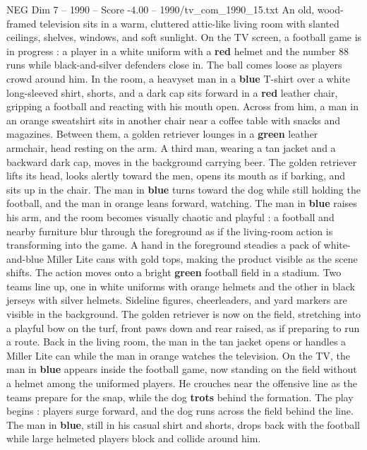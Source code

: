 \begin{textsample}{NEG Dim 7 – 1990 – Score -4.00 – 1990/tv\_com\_1990\_15.txt}  \label{ex:f7_neg_034}
An old, wood-framed television sits in a warm, cluttered attic-like living room with slanted ceilings, shelves, windows, and soft sunlight.
On the TV screen, a football game is in progress : a player in a white uniform with a \textbf{red} helmet and the number 88 runs while black-and-silver defenders close in.
The ball comes loose as players crowd around him.
In the room, a heavyset man in a \textbf{blue} T-shirt over a white long-sleeved shirt, shorts, and a dark cap sits forward in a \textbf{red} leather chair, gripping a football and reacting with his mouth open.
Across from him, a man in an orange sweatshirt sits in another chair near a coffee table with snacks and magazines.
Between them, a golden retriever lounges in a \textbf{green} leather armchair, head resting on the arm.
A third man, wearing a tan jacket and a backward dark cap, moves in the background carrying beer.
The golden retriever lifts its head, looks alertly toward the men, opens its mouth as if barking, and sits up in the chair.
The man in \textbf{blue} turns toward the dog while still holding the football, and the man in orange leans forward, watching.
The man in \textbf{blue} raises his arm, and the room becomes visually chaotic and playful : a football and nearby furniture blur through the foreground as if the living-room action is transforming into the game.
A hand in the foreground steadies a pack of white-and-blue Miller Lite cans with gold tops, making the product visible as the scene shifts.
The action moves onto a bright \textbf{green} football field in a stadium.
Two teams line up, one in white uniforms with orange helmets and the other in black jerseys with silver helmets.
Sideline figures, cheerleaders, and yard markers are visible in the background.
The golden retriever is now on the field, stretching into a playful bow on the turf, front paws down and rear raised, as if preparing to run a route.
Back in the living room, the man in the tan jacket opens or handles a Miller Lite can while the man in orange watches the television.
On the TV, the man in \textbf{blue} appears inside the football game, now standing on the field without a helmet among the uniformed players.
He crouches near the offensive line as the teams prepare for the snap, while the dog \textbf{trots} behind the formation.
The play begins : players surge forward, and the dog runs across the field behind the line.
The man in \textbf{blue}, still in his casual shirt and shorts, drops back with the football while large helmeted players block and collide around him.

\end{textsample}
